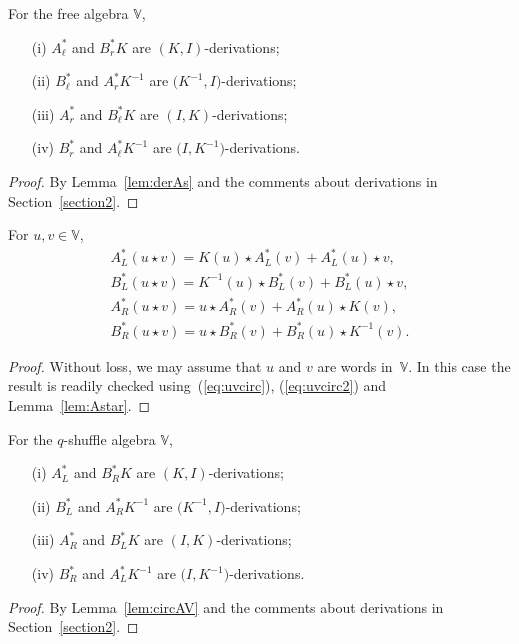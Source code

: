 \begin{Corollary}\label{cor:derFree}
For the free algebra $\mathbb V$,
\begin{enumerate}\itemsep=0pt
\item[\rm (i)]
$A^*_\ell$ and
$B^*_r K$ are
 $(K,I)$-derivations;
\item[\rm (ii)]
$B^*_\ell$ and
$A^*_r K^{-1}$ are
$\big(K^{-1},I\big)$-derivations;
\item[\rm (iii)]
$A^*_r$ and
$B^*_\ell K$ are
$(I,K)$-derivations;
\item[\rm (iv)]
$B^*_r$ and
$A^*_\ell K^{-1}$ are
$\big(I,K^{-1}\big)$-derivations.
\end{enumerate}
\end{Corollary}
\begin{proof} By Lemma~\ref{lem:derAs} and the comments about derivations in Section~\ref{section2}.
\end{proof}

\begin{Lemma}\label{lem:circAV}For $u,v \in \mathbb V$,
\begin{gather*}
A^*_L (u \star v) =K(u) \star A^*_L (v)+A^*_L (u) \star v,\\
B^*_L (u\star v) =K^{-1}(u) \star B^*_L (v)+B^*_L (u) \star v,\\
A^*_R (u\star v) =u \star A^*_R (v)+A^*_R (u) \star K(v),\\
B^*_R (u \star v) =u \star B^*_R (v)+B^*_R (u) \star K^{-1}(v).
\end{gather*}
\end{Lemma}
\begin{proof} Without loss, we may assume that $u$ and $v$ are words in~$\mathbb V$. In this case the result is readily checked using~(\ref{eq:uvcirc}), (\ref{eq:uvcirc2}) and Lemma~\ref{lem:Astar}.
\end{proof}

\begin{Corollary}\label{cor:derShuffle}For the $q$-shuffle algebra $\mathbb V$,
\begin{enumerate}\itemsep=0pt
\item[\rm (i)]
$A^*_L$ and
$B^*_R K$ are
$(K,I)$-derivations;
\item[\rm (ii)]
$B^*_L$ and
$A^*_R K^{-1}$ are
 $\big(K^{-1},I\big)$-derivations;
\item[\rm (iii)]
$A^*_R$ and
$B^*_L K$ are
$(I,K)$-derivations;
\item[\rm (iv)]$B^*_R$ and $A^*_L K^{-1}$ are $\big(I,K^{-1}\big)$-derivations.
\end{enumerate}
\end{Corollary}
\begin{proof} By Lemma~\ref{lem:circAV} and the comments about derivations in Section~\ref{section2}.
\end{proof}

